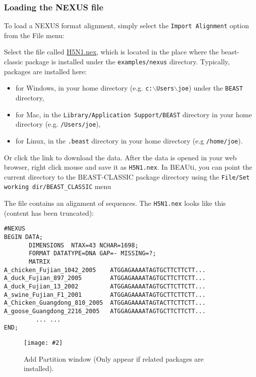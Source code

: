 \documentclass{article}
\newcommand{\includeimage}[2][]{%
\texttt{[image: \#2]}
}
\begin{document}
\subsubsection*{Loading the NEXUS file }

To load a NEXUS format alignment, simply select the \texttt{Import
Alignment} option from the File menu: 

Select the file called \href{https://raw.githubusercontent.com/BEAST2-Dev/beast-classic/master/examples/nexus/H5N1.nex}{H5N1.nex},
which is located in the place where the beast-classic package is installed under the {\tt examples/nexus} directory. Typically, packages are installed here:
\begin{itemize}
\item for Windows, in your home directory (e.g. {\tt c:$\backslash$Users$\backslash$joe}) under the {\tt BEAST} directory,
\item for Mac, in the {\tt Library/Application Support/BEAST} directory in your home directory (e.g. {\tt /Users/joe}),
\item for Linux, in the {\tt .beast} directory in your home directory (e.g {\tt /home/joe}).
\end{itemize}
Or click the link to download the data. After the data is opened in your web browser, right click mouse and save it as \texttt{H5N1.nex}.
In BEAUti, you can point the current directory to the BEAST-CLASSIC package directory using the \texttt{File/Set working dir/BEAST\_CLASSIC} menu

The file contains an alignment of sequences. The \texttt{H5N1.nex} looks like this (content has been truncated):

\begin{verbatim}
#NEXUS
BEGIN DATA;
       DIMENSIONS  NTAX=43 NCHAR=1698;
       FORMAT DATATYPE=DNA GAP=- MISSING=?;
       MATRIX 	
A_chicken_Fujian_1042_2005    ATGGAGAAAATAGTGCTTCTTCTT...
A_duck_Fujian_897_2005        ATGGAGAAAATAGTGCTTCTTCTT...
A_duck_Fujian_13_2002         ATGGAGAAAATAGTGCTTCTTCTT...
A_swine_Fujian_F1_2001        ATGGAGAAAATAGTGCTTCTTCTT...
A_Chicken_Guangdong_810_2005  ATGGAGAAAATAGTACTTCTTCTT...
A_goose_Guangdong_2216_2005   ATGGAGAAAATAGTGCTTCTTCTT...
         ... ...
END;
\end{verbatim}

\begin{figure}
\centering	
\includeimage[width=0.5\textwidth]{figures/AddPartition}
\caption{Add Partition window (Only appear if related packages are installed).}
\label{fig:addPartition}
\end{figure}
\end{document}
